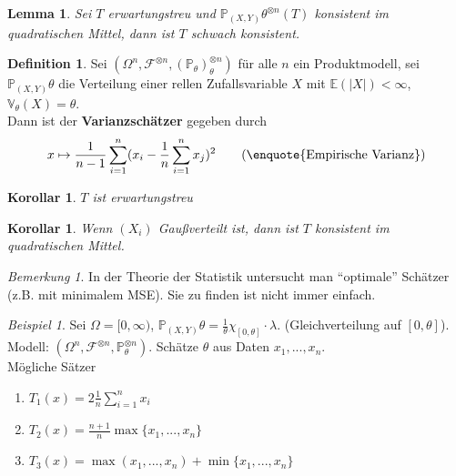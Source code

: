 \documentclass[10pt,a4paper]{article}
\newcommand{\la}{\ensuremath{\lambda}}
\newcommand{\Prb}{\mathbb P}
\newcommand{\Epv}{\ensuremath{\mathbb{E}}}
\newcommand{\Var}{\mathbb{V}}
\newcommand{\scF}{\ensuremath{\mathscr{F}}}
\theoremstyle{plain}
\newtheorem{lem}[theorem]{Lemma}
\newtheorem{kor}[theorem]{Korollar}
\theoremstyle{definition}
\newtheorem{definition}[theorem]{Definition}
\theoremstyle{remark}
\newtheorem*{bem*}{Bemerkung}
\newtheorem{exm}[theorem]{Beispiel}
\begin{document}
	\begin{lem}
		Sei $T$ erwartungstreu und $\Prb_{(X,Y)}\theta^{\otimes n}(T)$ konsistent im quadratischen Mittel, dann ist $T$ schwach konsistent.
	\end{lem}
	
	\begin{definition}
		Sei $(\Omega^n,\scF^{\otimes n},(\Prb_\theta)_\theta^{\otimes n})$ für alle $n$ ein Produktmodell, sei $\Prb_{(X,Y)}\theta$ die Verteilung einer rellen Zufallsvariable $X$ mit $\Epv(|X|)<\infty$, $\Var_\theta(X)=\theta$.\\
		Dann ist der \textbf{Varianzschätzer} gegeben durch
		\[x\mapsto\frac{1}{n-1}\sum_{i=1}^{n}(x_i-\frac{1}{n}\sum_{i=1}^{n}x_j)^2\tag{\enquote{Empirische Varianz}}\]
	\end{definition}
	\addtocounter{theorem}{-1}
	\begin{kor}
		$T$ ist erwartungstreu
	\end{kor}
	\addtocounter{theorem}{-1}
	\begin{kor}
		Wenn $(X_i)$ Gaußverteilt ist, dann ist $T$ konsistent im quadratischen Mittel.
	\end{kor}

	\begin{bem*}
		In der Theorie der Statistik untersucht man \enquote{optimale} Schätzer (z.B. mit minimalem MSE). Sie zu finden ist nicht immer einfach.
	\end{bem*}

	\begin{exm}
		Sei $\Omega=[0,\infty)$, $\Prb_{(X,Y)}\theta=\frac{1}{\theta}\chi_{[0,\theta]}\cdot\la$. (Gleichverteilung auf $[0,\theta]$).\\
		Modell: $(\Omega^n,\scF^{\otimes n},\Prb_\theta^{\otimes n})$. Schätze $\theta$ aus Daten $x_1,...,x_n$.\\
		Mögliche Sätzer
		\begin{enumerate}
			\item $T_1(x)=2\frac{1}{n}\sum_{i=1}^{n}x_i$
			\item $T_2(x)=\frac{n+1}{n}\max\{x_1,...,x_n\}$
			\item $T_3(x)=\max(x_1,...,x_n)+\min\{x_1,...,x_n\}$
		\end{enumerate}
	\end{exm}
\end{document}
